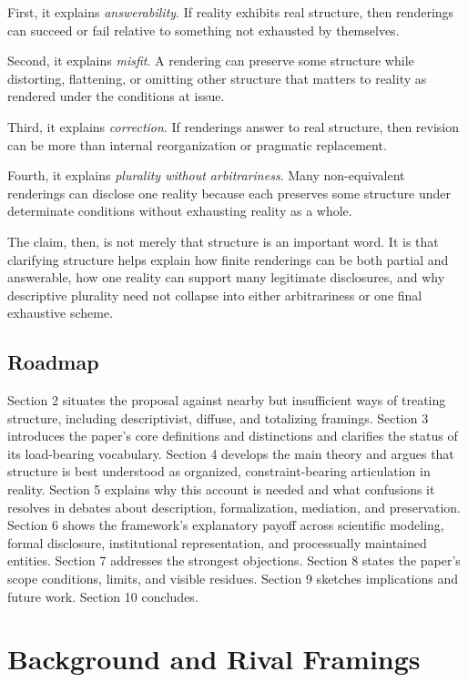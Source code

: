 \documentclass[11pt]{article}
\renewcommand{\emph}[1]{\textit{#1}}
\begin{document}
First, it explains \emph{answerability}. If reality exhibits real structure, then renderings can succeed or fail relative to something not exhausted by themselves.

Second, it explains \emph{misfit}. A rendering can preserve some structure while distorting, flattening, or omitting other structure that matters to reality as rendered under the conditions at issue.

Third, it explains \emph{correction}. If renderings answer to real structure, then revision can be more than internal reorganization or pragmatic replacement.

Fourth, it explains \emph{plurality without arbitrariness}. Many non-equivalent renderings can disclose one reality because each preserves some structure under determinate conditions without exhausting reality as a whole. \cite{Giere2006ScientificPerspectivism,Massimi2022PerspectivalRealism,Ludwig2021ScientificPluralismSEP}

The claim, then, is not merely that structure is an important word. It is that clarifying structure helps explain how finite renderings can be both partial and answerable, how one reality can support many legitimate disclosures, and why descriptive plurality need not collapse into either arbitrariness or one final exhaustive scheme.

\subsection{Roadmap}

Section 2 situates the proposal against nearby but insufficient ways of treating structure, including descriptivist, diffuse, and totalizing framings. Section 3 introduces the paper's core definitions and distinctions and clarifies the status of its load-bearing vocabulary. Section 4 develops the main theory and argues that structure is best understood as organized, constraint-bearing articulation in reality. Section 5 explains why this account is needed and what confusions it resolves in debates about description, formalization, mediation, and preservation. Section 6 shows the framework's explanatory payoff across scientific modeling, formal disclosure, institutional representation, and processually maintained entities. Section 7 addresses the strongest objections. Section 8 states the paper's scope conditions, limits, and visible residues. Section 9 sketches implications and future work. Section 10 concludes.

\section{Background and Rival Framings}
\end{document}
